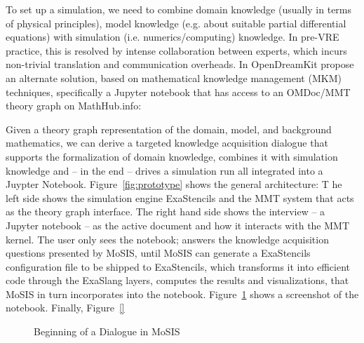  To set up a simulation, we need to combine domain knowledge (usually in terms of physical principles), model knowledge (e.g. about suitable partial differential equations) with simulation (i.e. numerics/computing) knowledge.
In pre-VRE practice, this is resolved by intense collaboration between experts, which incurs non-trivial translation and communication overheads.
In OpenDreamKit propose an alternate solution, based on mathematical knowledge management (MKM) techniques, specifically a Jupyter notebook that has access to an OMDoc/MMT theory graph on MathHub.info: 

Given a theory graph representation of the domain, model, and background mathematics, we
can derive a targeted knowledge acquisition dialogue that supports the formalization of
domain knowledge, combines it with simulation knowledge and -- in the end -- drives a
simulation run all integrated into a Juypter Notebook.
Figure~\ref{fig:prototype} shows the general architecture:
T he left side shows the simulation engine \textsf{ExaStencils} and the MMT system that acts as the theory graph interface. The right hand side shows the interview – a Jupyter notebook – as the active document and how it interacts with the MMT kernel. The user only sees the notebook; answers the knowledge acquisition questions presented by MoSIS, until MoSIS can generate a ExaStencils configuration file to be shipped to ExaStencils, which transforms it into efficient code through the ExaSlang layers, computes the results and visualizations, that MoSIS in turn incorporates into the notebook. Figure~\ref{fig:int_begin} shows a screenshot of the notebook. Finally, Figure~\ref{}

\begin{figure}[ht]
  \caption{Beginning of a Dialogue in MoSIS}\label{fig:int_begin}
\end{figure}



